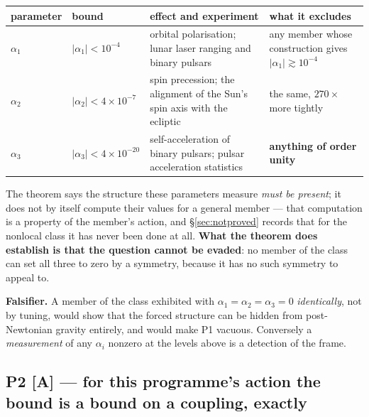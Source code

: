 \documentclass[11pt,letterpaper]{article}
\begin{document}
\begin{center}\small
\setlength{\tabcolsep}{4pt}\begin{tabular}{L{0.11\textwidth}L{0.18\textwidth}L{0.38\textwidth}L{0.19\textwidth}}\toprule
parameter & bound & effect and experiment & what it excludes\\\midrule
$\alpha_1$ & $|\alpha_1|<10^{-4}$ & orbital polarisation; lunar laser ranging and binary pulsars & any member whose construction gives $|\alpha_1|\gtrsim10^{-4}$\\
$\alpha_2$ & $|\alpha_2|<4\times10^{-7}$ & spin precession; the alignment of the Sun's spin axis with the ecliptic & the same, $270\times$ more tightly\\
$\alpha_3$ & $|\alpha_3|<4\times10^{-20}$ & self-acceleration of binary pulsars; pulsar acceleration statistics & \textbf{anything of order unity}\\\bottomrule
\end{tabular}
\end{center}

The theorem says the structure these parameters measure \emph{must be present}; it does not by itself compute their values for a general member --- that computation is a property of the member's action, and \S\ref{sec:notproved} records that for the nonlocal class it has never been done at all. \textbf{What the theorem does establish is that the question cannot be evaded}: no member of the class can set all three to zero by a symmetry, because it has no such symmetry to appeal to.

\textbf{Falsifier.} A member of the class exhibited with $\alpha_1=\alpha_2=\alpha_3=0$ \emph{identically}, not by tuning, would show that the forced structure can be hidden from post-Newtonian gravity entirely, and would make P1 vacuous. Conversely a \emph{measurement} of any $\alpha_i$ nonzero at the levels above is a detection of the frame.

\subsection{P2 [A] --- for this programme's action the bound is a bound on a coupling, exactly}
\end{document}
